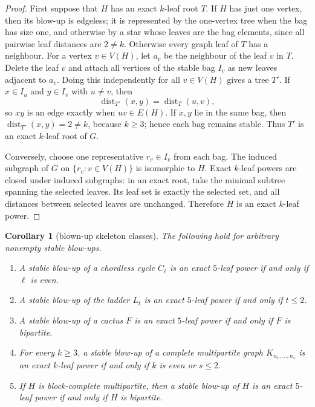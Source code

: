 \documentclass[11pt]{article}
\newtheorem{corollary}[theorem]{Corollary}
\theoremstyle{definition}
\newcommand{\dist}{\operatorname{dist}}
\begin{document}
\begin{proof}
First suppose that $H$ has an exact $k$-leaf root $T$.  If $H$ has just one vertex, then its blow-up is edgeless; it is represented by the one-vertex tree when the bag has size one, and otherwise by a star whose leaves are the bag elements, since all pairwise leaf distances are $2\ne k$.  Otherwise every graph leaf of $T$ has a neighbour.  For a vertex $v\in V(H)$, let $a_v$ be the neighbour of the leaf $v$ in $T$.  Delete the leaf $v$ and attach all vertices of the stable bag $I_v$ as new leaves adjacent to $a_v$.  Doing this independently for all $v\in V(H)$ gives a tree $T'$.  If $x\in I_u$ and $y\in I_v$ with $u\ne v$, then
\[
 \dist_{T'}(x,y)=\dist_T(u,v),
\]
so $xy$ is an edge exactly when $uv\in E(H)$.  If $x,y$ lie in the same bag, then $\dist_{T'}(x,y)=2\ne k$, because $k\ge3$; hence each bag remains stable.  Thus $T'$ is an exact $k$-leaf root of $G$.

Conversely, choose one representative $r_v\in I_v$ from each bag.  The induced subgraph of $G$ on $\{r_v:v\in V(H)\}$ is isomorphic to $H$.  Exact $k$-leaf powers are closed under induced subgraphs: in an exact root, take the minimal subtree spanning the selected leaves.  Its leaf set is exactly the selected set, and all distances between selected leaves are unchanged.  Therefore $H$ is an exact $k$-leaf power.
\end{proof}

\begin{corollary}[blown-up skeleton classes]\label{cor:blown-up-skeletons}
The following hold for arbitrary nonempty stable blow-ups.
\begin{enumerate}[label=\textup{(\roman*)}]
\item A stable blow-up of a chordless cycle $C_\ell$ is an exact $5$-leaf power if and only if $\ell$ is even.
\item A stable blow-up of the ladder $L_t$ is an exact $5$-leaf power if and only if $t\le2$.
\item A stable blow-up of a cactus $F$ is an exact $5$-leaf power if and only if $F$ is bipartite.
\item For every $k\ge3$, a stable blow-up of a complete multipartite graph $K_{n_1,\ldots,n_s}$ is an exact $k$-leaf power if and only if $k$ is even or $s\le2$.
\item If $H$ is block-complete multipartite, then a stable blow-up of $H$ is an exact $5$-leaf power if and only if $H$ is bipartite.
\end{enumerate}
\end{corollary}
\end{document}
